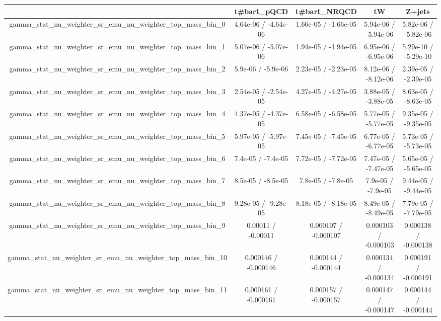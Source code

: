 \documentclass[10pt]{article}
\begin{document}
\begin{table}[htbp]
\begin{center}
\begin{tabular}{|c|c|c|c|c|}
\hline 
      & t#bar{t}_{pQCD}      & t#bar{t}_{NRQCD}      & tW      & Z+jets \\ 
\hline 
  gamma_stat_nu_weighter_sr_emu_nu_weighter_top_mass_bin_0 & 4.64e-06 / -4.64e-06 & 1.66e-05 / -1.66e-05 & 5.94e-06 / -5.94e-06 & 5.82e-06 / -5.82e-06 \\ 
  gamma_stat_nu_weighter_sr_emu_nu_weighter_top_mass_bin_1 & 5.07e-06 / -5.07e-06 & 1.94e-05 / -1.94e-05 & 6.95e-06 / -6.95e-06 & 5.29e-10 / -5.29e-10 \\ 
  gamma_stat_nu_weighter_sr_emu_nu_weighter_top_mass_bin_2 & 5.9e-06 / -5.9e-06 & 2.23e-05 / -2.23e-05 & 8.12e-06 / -8.12e-06 & 2.39e-05 / -2.39e-05 \\ 
  gamma_stat_nu_weighter_sr_emu_nu_weighter_top_mass_bin_3 & 2.54e-05 / -2.54e-05 & 4.27e-05 / -4.27e-05 & 3.88e-05 / -3.88e-05 & 8.63e-05 / -8.63e-05 \\ 
  gamma_stat_nu_weighter_sr_emu_nu_weighter_top_mass_bin_4 & 4.37e-05 / -4.37e-05 & 6.58e-05 / -6.58e-05 & 5.77e-05 / -5.77e-05 & 9.35e-05 / -9.35e-05 \\ 
  gamma_stat_nu_weighter_sr_emu_nu_weighter_top_mass_bin_5 & 5.97e-05 / -5.97e-05 & 7.45e-05 / -7.45e-05 & 6.77e-05 / -6.77e-05 & 5.73e-05 / -5.73e-05 \\ 
  gamma_stat_nu_weighter_sr_emu_nu_weighter_top_mass_bin_6 & 7.4e-05 / -7.4e-05 & 7.72e-05 / -7.72e-05 & 7.47e-05 / -7.47e-05 & 5.65e-05 / -5.65e-05 \\ 
  gamma_stat_nu_weighter_sr_emu_nu_weighter_top_mass_bin_7 & 8.5e-05 / -8.5e-05 & 7.8e-05 / -7.8e-05 & 7.9e-05 / -7.9e-05 & 9.44e-05 / -9.44e-05 \\ 
  gamma_stat_nu_weighter_sr_emu_nu_weighter_top_mass_bin_8 & 9.28e-05 / -9.28e-05 & 8.18e-05 / -8.18e-05 & 8.49e-05 / -8.49e-05 & 7.79e-05 / -7.79e-05 \\ 
  gamma_stat_nu_weighter_sr_emu_nu_weighter_top_mass_bin_9 & 0.00011 / -0.00011 & 0.000107 / -0.000107 & 0.000103 / -0.000103 & 0.000138 / -0.000138 \\ 
  gamma_stat_nu_weighter_sr_emu_nu_weighter_top_mass_bin_10 & 0.000146 / -0.000146 & 0.000144 / -0.000144 & 0.000134 / -0.000134 & 0.000191 / -0.000191 \\ 
  gamma_stat_nu_weighter_sr_emu_nu_weighter_top_mass_bin_11 & 0.000161 / -0.000161 & 0.000157 / -0.000157 & 0.000147 / -0.000147 & 0.000144 / -0.000144 \\ 

\end{tabular}
\end{center}
\end{table}
\end{document}
